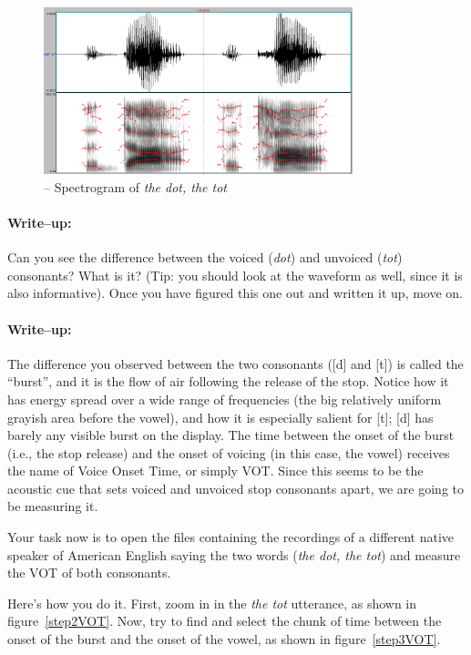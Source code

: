 \begin{figure}[!tbp]
\caption{\Praat{} -- Spectrogram of \emph{the dot, the tot}}
\label{step1VOT}
	\begin{center}
		\includegraphics[width=0.8\textwidth]{./figures/Part-C-VOT-thedotthetot1}
	\end{center}
\end{figure}

\paragraph{Write--up:} Can you see the difference between the voiced (\emph{dot}) and unvoiced (\emph{tot}) consonants? What is it? (Tip: you should look at the waveform as well, since it is also informative). Once you have figured this one out and written it up, move on.

\paragraph{Write--up:} The difference you observed between the two consonants ([d] and [t]) is called the ``burst'', and it is the flow of air following the release of the stop. Notice how it has energy spread over a wide range of frequencies (the big relatively uniform grayish area before the vowel), and how it is especially salient for [t]; [d] has barely any visible burst on the display. The time between the onset of the burst (i.e., the stop release) and the onset of voicing (in this case, the vowel) receives the name of Voice Onset Time, or simply VOT. Since this seems to be the acoustic cue that sets voiced and unvoiced stop consonants apart, we are going to be measuring it.

Your task now is to open the files containing the recordings of a different native speaker of American English saying the two words (\emph{the dot, the tot}) and measure the VOT of both consonants.

Here's how you do it. First, zoom in in the \emph{the tot} utterance, as shown in figure~\ref{step2VOT}. Now, try to find and select the chunk of time between the onset of the burst and the onset of the vowel, as shown in figure~\ref{step3VOT}. 


